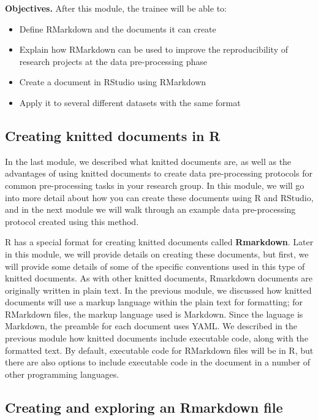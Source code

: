 \documentclass[]{tufte-book}
\providecommand{\tightlist}{%
  \setlength{\itemsep}{0pt}\setlength{\parskip}{0pt}}
\begin{document}
\textbf{Objectives.} After this module, the trainee will be able to:

\begin{itemize}
\tightlist
\item
  Define RMarkdown and the documents it can create
\item
  Explain how RMarkdown can be used to improve the reproducibility of research
  projects at the data pre-processing phase
\item
  Create a document in RStudio using RMarkdown
\item
  Apply it to several different datasets with the same format
\end{itemize}

\hypertarget{creating-knitted-documents-in-r}{%
\subsection{Creating knitted documents in R}\label{creating-knitted-documents-in-r}}

In the last module, we described what knitted documents are, as well as the
advantages of using knitted documents to create data pre-processing protocols
for common pre-processing tasks in your research group. In this module, we will
go into more detail about how you can create these documents using R and
RStudio, and in the next module we will walk through an example data
pre-processing protocol created using this method.

R has a special format for creating knitted documents called \textbf{Rmarkdown}.
Later in this module, we will provide details on creating these documents, but
first, we will provide some details of some of the specific conventions used in
this type of knitted documents. As with other knitted documents, Rmarkdown
documents are originally written in plain text. In the previous module, we
discussed how knitted documents will use a markup language within the plain text
for formatting; for RMarkdown files, the markup language used is Markdown. Since
the laguage is Markdown, the preamble for each document uses YAML. We described
in the previous module how knitted documents include executable code, along with
the formatted text. By default, executable code for RMarkdown files will be in
R, but there are also options to include executable code in the document in a
number of other programming languages.

\hypertarget{creating-and-exploring-an-rmarkdown-file}{%
\subsection{Creating and exploring an Rmarkdown file}\label{creating-and-exploring-an-rmarkdown-file}}
\end{document}
